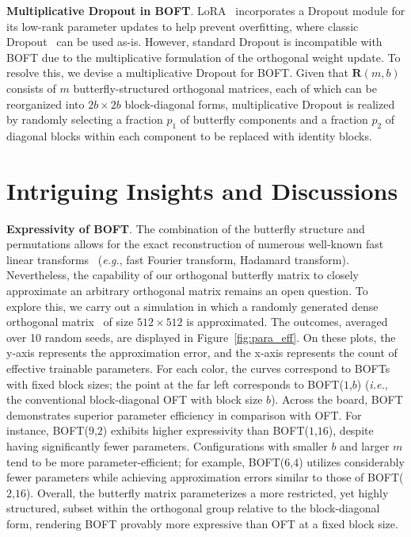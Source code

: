 \textbf{Multiplicative Dropout in BOFT}. LoRA~\cite{hulora2022} incorporates a Dropout module for its low-rank parameter updates to help prevent overfitting, where classic Dropout~\cite{srivastava2014dropout} can be used as-is. However, standard Dropout is incompatible with BOFT due to the multiplicative formulation of the orthogonal weight update. To resolve this, we devise a multiplicative Dropout for BOFT. Given that $\bm{R}(m,b)$ consists of $m$ butterfly-structured orthogonal matrices, each of which can be reorganized into $2b \times 2b$ block-diagonal forms, multiplicative Dropout is realized by randomly selecting a fraction $p_1$ of butterfly components and a fraction $p_2$ of diagonal blocks within each component to be replaced with identity blocks.

\section{Intriguing Insights and Discussions}

\textbf{Expressivity of BOFT}. The combination of the butterfly structure and permutations allows for the exact reconstruction of numerous well-known fast linear transforms~\cite{dao2019learning,dao2019kaleidoscope} (\emph{e.g.}, fast Fourier transform, Hadamard transform). Nevertheless, the capability of our orthogonal butterfly matrix to closely approximate an arbitrary orthogonal matrix remains an open question. To explore this, we carry out a simulation in which a randomly generated dense orthogonal matrix~\cite{anderson1987generation} of size $512\times 512$ is approximated. The outcomes, averaged over 10 random seeds, are displayed in Figure~\ref{fig:para_eff}. On these plots, the y-axis represents the approximation error, and the x-axis represents the count of effective trainable parameters. For each color, the curves correspond to BOFTs with fixed block sizes; the point at the far left corresponds to BOFT($1$,$b$) (\emph{i.e.}, the conventional block-diagonal OFT with block size $b$). Across the board, BOFT demonstrates superior parameter efficiency in comparison with OFT. For instance, BOFT($9$,$2$) exhibits higher expressivity than BOFT($1$,$16$), despite having significantly fewer parameters. Configurations with smaller $b$ and larger $m$ tend to be more parameter-efficient; for example, BOFT($6$,$4$) utilizes considerably fewer parameters while achieving approximation errors similar to those of BOFT($2$,$16$). Overall, the butterfly matrix parameterizes a more restricted, yet highly structured, subset within the orthogonal group relative to the block-diagonal form, rendering BOFT provably more expressive than OFT at a fixed block size.

